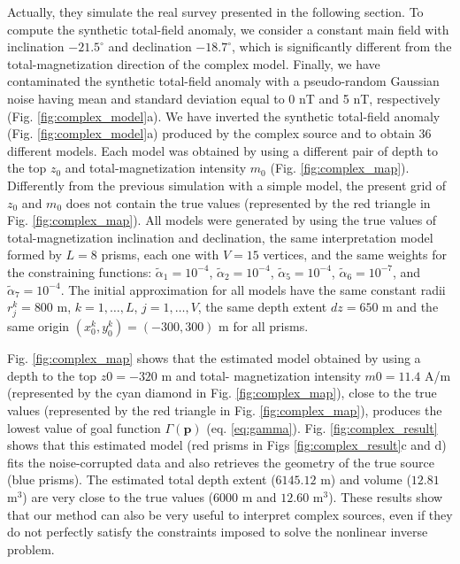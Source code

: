 Actually, they simulate the real survey presented in the following section. To compute the synthetic total-field anomaly, we consider a constant main field with inclination $ -21.5^\circ $ and declination $ -18.7^\circ $, which is significantly different from the total-magnetization direction of the complex model. Finally, we have
contaminated the synthetic total-field anomaly with a pseudo-random Gaussian noise having mean and standard deviation equal to 0 nT and 5 nT, respectively (Fig. \ref{fig:complex_model}a). We have inverted the synthetic total-field anomaly (Fig. \ref{fig:complex_model}a) produced by the complex source and to obtain 36 different models. Each model was obtained by using a different pair of depth to the top $ z_0 $
and total-magnetization intensity $ m_0 $ (Fig. \ref{fig:complex_map}). Differently from the previous simulation with a simple model, the present grid of $ z_0 $ and $ m_0 $ does not contain the true values (represented by the red triangle in Fig. \ref{fig:complex_map}). All models were generated by using the true values of total-magnetization inclination and declination, the same interpretation model formed by $ L = 8 $ prisms, each one with $ V = 15 $ vertices, and the same weights for the constraining functions: $\tilde{\alpha}_1 = 10^{-4}$, $\tilde{\alpha}_2 = 10^{-4}$, $\tilde{\alpha}_5 = 10^{-4}$, $\tilde{\alpha}_6 = 10^{-7}$, and $\tilde{\alpha}_7 = 10^{-4}$. The initial approximation
for all models have the same constant radii $ r^k_j = 800 $ m, $ k = 1, \dots, L $, $ j = 1, \dots, V $, the same depth extent
$ dz = 650 $ m and the same origin $ (x^k_0, y^k_0) = (-300, 300) $ m for all prisms.

Fig. \ref{fig:complex_map} shows that the estimated model obtained by using a depth to the top $ z0 = -320 $ m and total- magnetization intensity $ m0 = 11.4 $ A/m (represented by the cyan diamond in Fig. \ref{fig:complex_map}), close to the true values (represented by the red triangle in Fig. \ref{fig:complex_map}), produces the lowest value of goal function $ \Gamma(\mathbf{p}) $ (eq. \ref{eq:gamma}). Fig. \ref{fig:complex_result} shows that this estimated model (red prisms in Figs \ref{fig:complex_result}c and d) fits the noise-corrupted data and also retrieves the geometry of the true source (blue prisms). The estimated total depth extent ($ 6145.12 $ m) and volume ($ 12.81 $ m$^3 $) are very close to the true values ($ 6000 $ m and $ 12.60 $ m$^3 $). These results show that our method can also be very useful to interpret complex sources, even if they do not perfectly satisfy the constraints imposed to solve the nonlinear inverse problem.